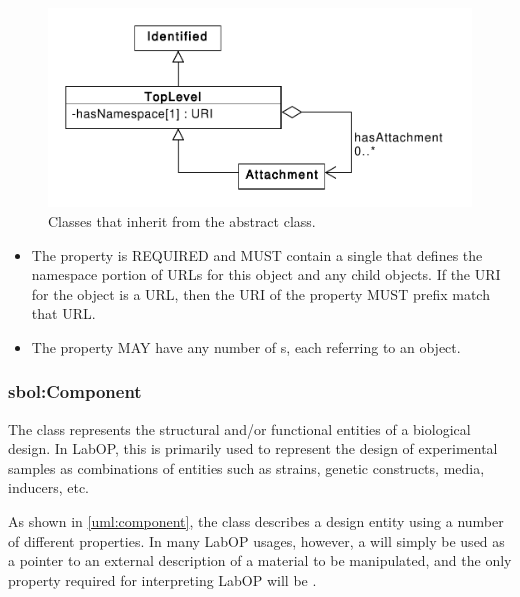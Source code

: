 \begin{figure}[ht]
\begin{center}
\includegraphics[scale=0.6]{sbol_classes/toplevel}
\caption[]{Classes that inherit from the  abstract class.}
\label{uml:toplevel}
\end{center}
\end{figure}

\begin{itemize}
\item \label{sec:sbol:hasNamespace}
The  property is REQUIRED and MUST contain a single  that defines the namespace portion of URLs for this object and any child objects.
If the URI for the  object is a URL, then the URI of the  property MUST prefix match that URL.

\item 
\label{sec:sbol:hasAttachment}
The  property MAY have any number of s, each referring to an  object.
\end{itemize}


\subsubsection{sbol:Component}
\label{sec:sbol:Component}

The  class represents the structural and/or functional entities of a biological design. 
In LabOP, this is primarily used to represent the design of experimental samples as combinations of entities such as strains, genetic constructs, media, inducers, etc.

As shown in \ref{uml:component}, the  class describes a design entity using a number of different properties.
In many LabOP usages, however, a  will simply be used as a pointer to an external description of a material to be manipulated, and the only property required for interpreting LabOP will be .

